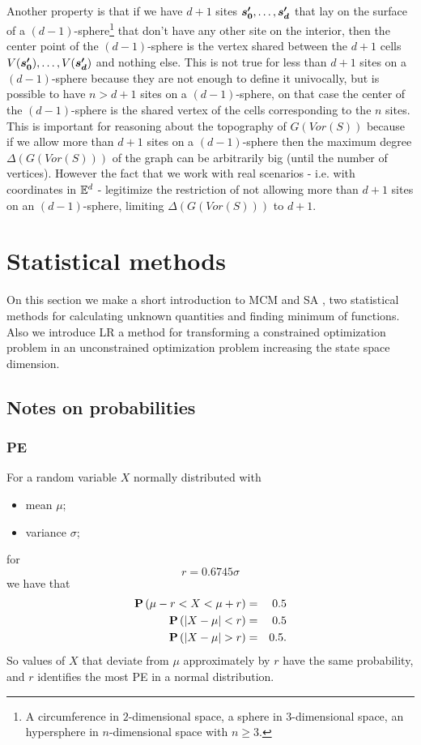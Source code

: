 \documentclass[dissertation.tex]{subfiles}
\begin{document}
Another property is that if we have $d+1$ sites $\boldsymbol{s_0'},\dots,\boldsymbol{s_d'}$ that lay on the
surface of a $(d-1)$-sphere\footnote{A circumference in $2$-dimensional
  space, a sphere in $3$-dimensional space, an hypersphere in
  $n$-dimensional space with $n\ge 3$.} that don't have any other site on
the interior, then the center point of the $(d-1)$-sphere is the
vertex shared between the $d+1$ cells $V(\boldsymbol{s_0'}),\dots,V(\boldsymbol{s_d'})$
and nothing else. This is not true for less than $d+1$ sites on a
$(d-1)$-sphere because they are not enough to define it univocally,
but is possible to have $n>d+1$ sites on a $(d-1)$-sphere, on that
case the center of the $(d-1)$-sphere is the shared vertex of the
cells corresponding to the $n$ sites. This is important for reasoning
about the topography of $G(Vor(S))$ because if we allow more than
$d+1$ sites on a $(d-1)$-sphere then the maximum degree
$\Delta(G(Vor(S)))$ of the graph can be arbitrarily big (until the
number of vertices). However the fact that we work with real scenarios -
i.e. with coordinates in $\mathbb{E}^d$ - legitimize the restriction of not
allowing more than $d+1$ sites on an $(d-1)$-sphere, limiting
$\Delta(G(Vor(S)))$ to $d+1$.

\section{Statistical methods}\label{sec:statisticalMethods}
On this section we make a short introduction to \ac{MCM}
\cite{metropolis}\cite{sobol}\cite{newman} and \ac{SA} \cite{kirkpatrick}\cite{ho},
two statistical methods for calculating unknown quantities and finding
minimum of functions. Also we introduce \ac{LR} \cite{benjamin} a
method for transforming a constrained optimization problem in an
unconstrained optimization problem increasing the state space
dimension.
\subsection{Notes on probabilities}
\subsubsection{\ac{PE}}
For a random variable $X$ normally distributed with
\begin{itemize}
\item mean $\mu$;
\item variance $\sigma$;
\end{itemize}
for
\begin{equation*}
  r=0.6745\sigma
\end{equation*}
we have that
\begin{eqnarray*}
  \prob{\mu-r<X<\mu+r} &=& 0.5\\
  \prob{\abs{X-\mu}<r} &=& 0.5\\
  \prob{\abs{X-\mu}>r} &=& 0.5.
\end{eqnarray*}
So values of $X$ that deviate from $\mu$ approximately by $r$ have the
same probability, and $r$ identifies the most \ac{PE} in a
normal distribution.
\end{document}
